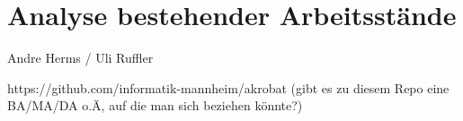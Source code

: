 \chapter{Analyse bestehender Arbeitsstände}

Andre Herms / Uli Ruffler

https://github.com/informatik-mannheim/akrobat (gibt es zu diesem Repo eine BA/MA/DA o.Ä, auf die man sich beziehen könnte?)